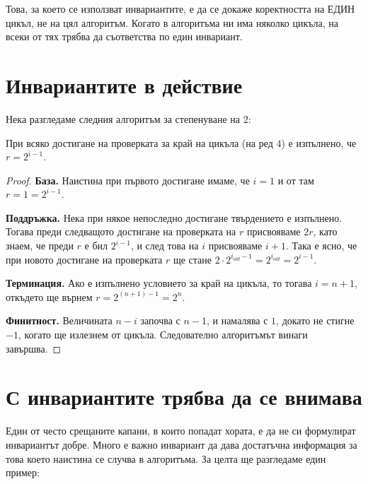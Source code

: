 \begin{warning}
    Това, за което се използват инвариантите, е да се докаже коректността на ЕДИН цикъл, не на цял алгоритъм.
    Когато в алгоритъма ни има няколко цикъла, на всеки от тях трябва да съответства по един инвариант.
\end{warning}

\section{Инвариантите в действие}

Нека разгледаме следния алгоритъм за степенуване на $2$:


\begin{invariant}
    При всяко достигане на проверката за край на цикъла (на ред $4$) е изпълнено, че $r = 2^{i - 1}$.
\end{invariant}
\begin{proof}
    \phantom{1}

    \textbf{База.}
    Наистина при първото достигане имаме, че $i = 1$ и от там $r = 1 = 2^{i - 1}$.

    \textbf{Поддръжка.}
    Нека при някое непоследно достигане твърдението е изпълнено.
    Тогава преди следващото достигане на проверката на $r$ присвояваме $2r$, като знаем, че преди $r$ е бил $2^{i - 1}$, и след това на $i$ присвояваме $i + 1$.
    Така е ясно, че при новото достигане на проверката $r$ ще стане $2 \cdot 2^{i_{old} - 1} = 2^{i_{old}} = 2^{i - 1}$.

    \textbf{Терминация.}
    Ако е изпълнено условието за край на цикъла, то тогава $i = n + 1$, откъдето ще върнем $r = 2^{(n + 1) - 1} = 2^n$.

    \textbf{Финитност.}
    Величината $n - i$ започва с $n - 1$, и намалява с $1$, докато не стигне $-1$, когато ще излезнем от цикъла.
    Следователно алгоритъмът винаги завършва.
\end{proof}

\section{С инвариантите трябва да се внимава}

Един от често срещаните капани, в които попадат хората, е да не си формулират инвариантът добре.
Много е важно инвариант да дава достатъчна информация за това което наистина се случва в алгоритъма.
За целта ще разгледаме един пример:


